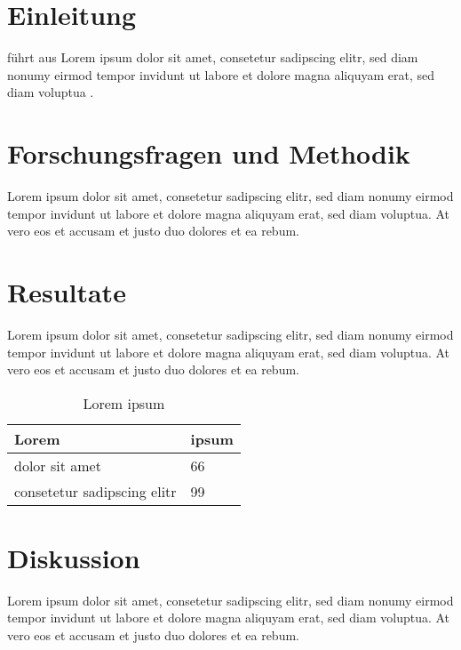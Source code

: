 \documentclass[a4paper,12pt]{scrartcl}
\begin{document}


\begin{multicols}{2}
\section{Einleitung}
\citeauthor{Student2022} führt aus Lorem ipsum dolor sit amet, consetetur sadipscing elitr, sed diam nonumy eirmod tempor invidunt ut labore et dolore magna aliquyam erat, sed diam voluptua \cite{Student2022}. 

\section{Forschungsfragen und Methodik}
Lorem ipsum dolor sit amet, consetetur sadipscing elitr, sed diam nonumy eirmod tempor invidunt ut labore et dolore magna aliquyam erat, sed diam voluptua. At vero eos et accusam et justo duo dolores et ea rebum.

\section{Resultate}
Lorem ipsum dolor sit amet, consetetur sadipscing elitr, sed diam nonumy eirmod tempor invidunt ut labore et dolore magna aliquyam erat, sed diam voluptua. At vero eos et accusam et justo duo dolores et ea rebum.

\begin{table}[ht]
\centering
\begin{tabular}{l l}
Lorem & ipsum \\\hline
dolor sit amet & 66 \\
consetetur sadipscing elitr & 99 \\
\end{tabular}
\caption{Lorem ipsum}
\label{tab:lorem}
\end{table}


\section{Diskussion}
Lorem ipsum dolor sit amet, consetetur sadipscing elitr, sed diam nonumy eirmod tempor invidunt ut labore et dolore magna aliquyam erat, sed diam voluptua. At vero eos et accusam et justo duo dolores et ea rebum.
\end{multicols}


\end{document}
